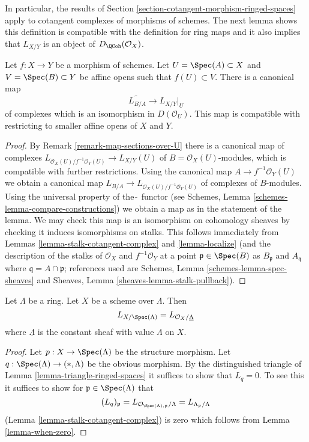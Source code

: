 \noindent
In particular, the results of
Section \ref{section-cotangent-morphism-ringed-spaces} apply
to cotangent complexes of morphisms of schemes.
The next lemma shows this definition is compatible with the definition
for ring maps and it also implies that $L_{X/Y}$ is an
object of $D_\QCoh(\mathcal{O}_X)$.

\begin{lemma}
\label{lemma-morphism-affine-schemes}
Let $f : X \to Y$ be a morphism of schemes. Let $U = \Spec(A) \subset X$
and $V = \Spec(B) \subset Y$ be affine opens such that $f(U) \subset V$.
There is a canonical map
$$
\widetilde{L_{B/A}} \longrightarrow L_{X/Y}|_U
$$
of complexes which is an isomorphism in $D(\mathcal{O}_U)$.
This map is compatible with restricting to smaller affine opens
of $X$ and $Y$.
\end{lemma}

\begin{proof}
By Remark \ref{remark-map-sections-over-U}
there is a canonical map of complexes
$L_{\mathcal{O}_X(U)/f^{-1}\mathcal{O}_Y(U)} \to L_{X/Y}(U)$
of $B = \mathcal{O}_X(U)$-modules, which is compatible
with further restrictions. Using the canonical map
$A \to f^{-1}\mathcal{O}_Y(U)$ we obtain a canonical map
$L_{B/A} \to L_{\mathcal{O}_X(U)/f^{-1}\mathcal{O}_Y(U)}$
of complexes of $B$-modules.
Using the universal property of the $\widetilde{\ }$
functor (see Schemes, Lemma \ref{schemes-lemma-compare-constructions})
we obtain a map as in the statement of the lemma.
We may check this map is an isomorphism on cohomology sheaves
by checking it induces isomorphisms on stalks.
This follows immediately from
Lemmas \ref{lemma-stalk-cotangent-complex} and \ref{lemma-localize}
(and the description of the stalks of
$\mathcal{O}_X$ and $f^{-1}\mathcal{O}_Y$
at a point $\mathfrak p \in \Spec(B)$ as $B_\mathfrak p$ and
$A_\mathfrak q$ where $\mathfrak q = A \cap \mathfrak p$; references
used are Schemes, Lemma \ref{schemes-lemma-spec-sheaves}
and
Sheaves, Lemma \ref{sheaves-lemma-stalk-pullback}).
\end{proof}

\begin{lemma}
\label{lemma-scheme-over-ring}
Let $\Lambda$ be a ring. Let $X$ be a scheme over $\Lambda$.
Then
$$
L_{X/\Spec(\Lambda)} = L_{\mathcal{O}_X/\underline{\Lambda}}
$$
where $\underline{\Lambda}$ is the constant sheaf with value
$\Lambda$ on $X$.
\end{lemma}

\begin{proof}
Let $p : X \to \Spec(\Lambda)$ be the structure morphism.
Let $q : \Spec(\Lambda) \to (*, \Lambda)$ be the obvious morphism.
By the distinguished triangle of Lemma \ref{lemma-triangle-ringed-spaces}
it suffices to show that $L_q = 0$. To see this it suffices to
show for $\mathfrak p \in \Spec(\Lambda)$ that
$$
(L_q)_\mathfrak p =
L_{\mathcal{O}_{\Spec(\Lambda), \mathfrak p}/\Lambda} =
L_{\Lambda_\mathfrak p/\Lambda}
$$
(Lemma \ref{lemma-stalk-cotangent-complex})
is zero which follows from Lemma \ref{lemma-when-zero}.
\end{proof}






